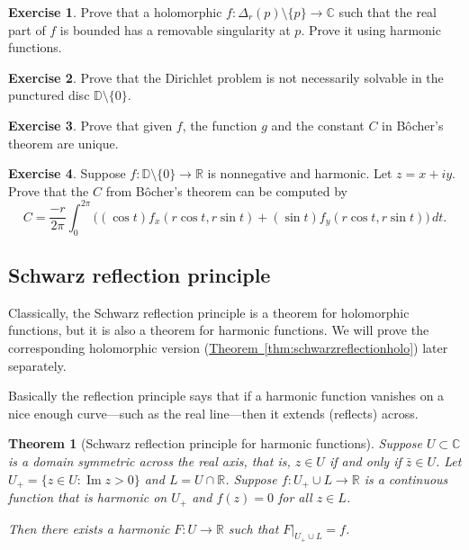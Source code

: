 \documentclass[12pt,openany]{book}
\renewcommand{\Im}{\operatorname{Im}}
\newcommand{\C}{{\mathbb{C}}}
\newcommand{\R}{{\mathbb{R}}}
\newcommand{\D}{{\mathbb{D}}}
\theoremstyle{plain}
\newtheorem{thm}{Theorem}[section]
\theoremstyle{remark}
\theoremstyle{definition}
\newenvironment{exbox}{%
    \def\FrameCommand{\vrule width 1pt \relax\hspace{10pt}}%
    \MakeFramed{\advance\hsize-\width\FrameRestore}%
}{%
    \endMakeFramed
}
\theoremstyle{exercise}
\newtheorem{exercise}{Exercise}[section]
\theoremstyle{example}
\newcommand{\thmref}[1]{\hyperref[#1]{Theorem~\ref*{#1}}}
\begin{document}
\begin{exbox}
\begin{exercise}
Prove that a holomorphic $f \colon \Delta_r(p) \setminus \{ p \} \to \C$
such that the real part of $f$ is bounded has a removable singularity at $p$.
Prove it using harmonic functions.
\end{exercise}

\begin{exercise} \label{exercise:nodirichletsolpuncturedD}
Prove that the Dirichlet problem is not necessarily solvable in the punctured disc $\D
\setminus \{ 0 \}$.
\end{exercise}

\begin{exercise}
Prove that given $f$, the function $g$ and the constant $C$ in 
B\^{o}cher's theorem are unique.
\end{exercise}

\begin{exercise}
Suppose $f \colon \D \setminus \{ 0 \} \to \R$ is nonnegative and harmonic.
Let $z=x+iy$.  Prove that the $C$ from B\^{o}cher's theorem can be computed by
\begin{equation*}
C =  \frac{-r}{2\pi} \int_0^{2\pi}
\bigl(
(\cos t) f_x (r\cos t,r\sin t) +
(\sin t) f_y (r\cos t,r\sin t) 
\bigr) \, dt .
\end{equation*}
\end{exercise}
\end{exbox}

\subsection{Schwarz reflection principle}

Classically, the Schwarz reflection principle is a theorem for holomorphic
functions, but it is also a theorem for harmonic functions.
We will prove the corresponding holomorphic version
(\thmref{thm:schwarzreflectionholo}) later separately.

Basically the reflection principle says that if a harmonic function vanishes on a nice enough
curve---such as the real line---then it extends (reflects) across.

\begin{thm}[Schwarz reflection principle for harmonic functions]%
%
\label{thm:schwarzreflectionharm}
Suppose $U \subset \C$ is a domain symmetric across the real axis, that is,
$z \in U$ if and only if $\bar{z} \in U$.
Let $U_+ = \{ z \in U : \Im z > 0 \}$ and $L = U \cap \R$.
Suppose $f \colon U_+ \cup L \to \R$ is a continuous function that is
harmonic on $U_+$ and $f(z) = 0$ for all $z \in L$.

Then there exists a harmonic $F \colon U \to \R$ such that
$F|_{U_+ \cup L} = f$.
\end{thm}
\end{document}
